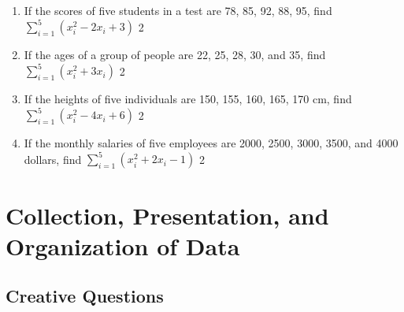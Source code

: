 \documentclass[a4paper,oneside]{book}
\begin{document}
\begin{enumerate}
\item 
If the scores of five students in a test are 78, 85, 92, 88, 95, 
find $\displaystyle \sum_{i=1}^5 (x_i^2 - 2x_i + 3)$ \hfill 2

\item 
If the ages of a group of people are 22, 25, 28, 30, and 35, 
find $\displaystyle \sum_{i=1}^5 (x_i^2 + 3x_i)$ \hfill 2

\item 
If the heights of five individuals are 150, 155, 160, 165, 170 cm, 
find $\displaystyle \sum_{i=1}^5 (x_i^2 - 4x_i + 6)$ \hfill 2

\item 
If the monthly salaries of five employees are 2000, 2500, 3000, 3500, and 4000 
dollars, find $\displaystyle \sum_{i=1}^5 (x_i^2 + 2x_i - 1)$ \hfill 2


\end{enumerate}

\chapter{Collection, Presentation, and Organization of Data} 

\section{Creative Questions}
\end{document}
